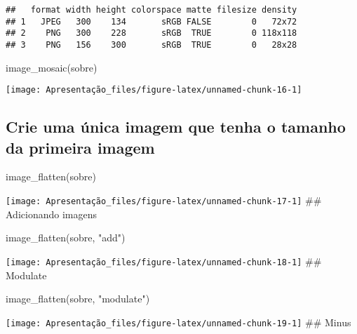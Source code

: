 \documentclass[
]{article}
\newenvironment{Shaded}{\begin{snugshade}}{\end{snugshade}}
\newcommand{\FunctionTok}[1]{\textcolor[rgb]{0.00,0.00,0.00}{#1}}
\newcommand{\NormalTok}[1]{#1}
\newcommand{\StringTok}[1]{\textcolor[rgb]{0.31,0.60,0.02}{#1}}
\begin{document}
\begin{verbatim}
##   format width height colorspace matte filesize density
## 1   JPEG   300    134       sRGB FALSE        0   72x72
## 2    PNG   300    228       sRGB  TRUE        0 118x118
## 3    PNG   156    300       sRGB  TRUE        0   28x28
\end{verbatim}

\begin{Shaded}
\begin{Highlighting}[]
\FunctionTok{image\_mosaic}\NormalTok{(sobre)}
\end{Highlighting}
\end{Shaded}

\texttt{[image: Apresentação\_files/figure-latex/unnamed-chunk-16-1]}

\hypertarget{crie-uma-uxfanica-imagem-que-tenha-o-tamanho-da-primeira-imagem}{%
\subsection{Crie uma única imagem que tenha o tamanho da primeira
imagem}\label{crie-uma-uxfanica-imagem-que-tenha-o-tamanho-da-primeira-imagem}}

\begin{Shaded}
\begin{Highlighting}[]
\FunctionTok{image\_flatten}\NormalTok{(sobre)}
\end{Highlighting}
\end{Shaded}

\texttt{[image: Apresentação\_files/figure-latex/unnamed-chunk-17-1]}
\#\# Adicionando imagens

\begin{Shaded}
\begin{Highlighting}[]
\FunctionTok{image\_flatten}\NormalTok{(sobre, }\StringTok{"add"}\NormalTok{)}
\end{Highlighting}
\end{Shaded}

\texttt{[image: Apresentação\_files/figure-latex/unnamed-chunk-18-1]}
\#\# Modulate

\begin{Shaded}
\begin{Highlighting}[]
\FunctionTok{image\_flatten}\NormalTok{(sobre, }\StringTok{"modulate"}\NormalTok{)}
\end{Highlighting}
\end{Shaded}

\texttt{[image: Apresentação\_files/figure-latex/unnamed-chunk-19-1]}
\#\# Minus
\end{document}
